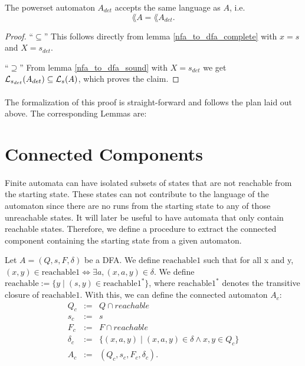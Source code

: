 \begin{theorem}
    The powerset automaton $A_{det}$ accepts the same language as $A$, i.e.
    \begin{equation*}        
        \lang{A} = \lang{A_{det}}.        
    \end{equation*}
\end{theorem}
\begin{proof}
    ``$\subseteq$'' 
    This follows directly from lemma \ref{nfa_to_dfa_complete} with $x = s$ and $X = {s}_{det}$.

    ``$\supseteq$''
    From lemma \ref{nfa_to_dfa_sound} with $X = {s}_{det}$ we get 
    $\mathcal{L}_{s_{det}}(A_{det}) \subseteq \mathcal{L}_{s}(A)$, which proves the claim.
\end{proof}

\paragraph{}
The formalization of this proof is straight-forward and follows the plan laid out above. 
The corresponding Lemmas are:


\section{Connected Components}
\paragraph{} 
Finite automata can have isolated subsets of states that are not reachable from the starting state. 
These states can not contribute to the language of the automaton since there are no runs from the starting state to any of those unreachable states.
It will later be useful to have automata that only contain reachable states. 
Therefore, we define a procedure to extract the connected component containing the starting state from a given automaton.

\begin{definition}
    Let $A = (Q, s, F, \delta)$ be a DFA.
    We define $\mathrm{reachable1}$ such that for all x and y, 
    $(x,y) \in \mathrm{reachable1} \iff \exists a, (x,a,y) \in \delta$.
    We define $\mathrm{reachable} := \{y \; | \; (s,y) \in \mathrm{reachable1}^*\}$, 
    where $\mathrm{reachable1}^*$ denotes the transitive closure of $\mathrm{reachable1}$.
    With this, we can define the connected automaton $A_c$:
    \begin{eqnarray*}
        Q_c & := & Q \cap reachable \\
        s_c & := & s \\
        F_c & := & F \cap reachable \\
        \delta_c & := & \{(x, a, y) \; | \; (x, a, y) \in \delta \wedge x,y \in Q_c \} \\
        A_c &:=& (Q_c, s_c, F_c, \delta_c).
    \end{eqnarray*}
\end{definition}

